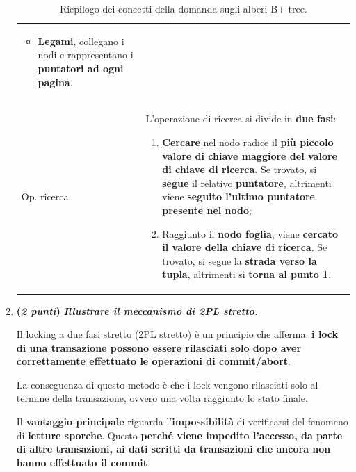 \documentclass[a4paper]{article}
\begin{document}
\begin{enumerate}
\begin{table}[!htp]
\begin{tabular}{@{} l p{23em} @{}}
\begin{itemize}
					\item \textbf{Legami}, collegano i nodi e rappresentano i \textbf{puntatori ad ogni pagina}.
				\end{itemize} \\ 
				Op. ricerca	& L'operazione di ricerca si divide in \textbf{due fasi}:
				\begin{enumerate}
					\item \textbf{Cercare} nel nodo radice il \textbf{più piccolo valore di chiave maggiore del valore di chiave di ricerca}. Se trovato, si \textbf{segue} il relativo \textbf{puntatore}, altrimenti viene \textbf{seguito l'ultimo puntatore presente nel nodo};
					
					\item Raggiunto il \textbf{nodo foglia}, viene \textbf{cercato il valore della chiave di ricerca}. Se trovato, si segue la \textbf{strada verso la tupla}, altrimenti si \textbf{torna al punto 1}.
				\end{enumerate} \\
				\bottomrule
			\end{tabular}
			\caption{Riepilogo dei concetti della domanda sugli alberi B+-tree.}
		\end{table}\newpage
		
		\item \textbf{(\emph{2 punti})} \textcolor{Green4}{\textbf{\emph{Illustrare il meccanismo di 2PL stretto.}}}\label{dom: 2PL stretto}
		
		Il locking a due fasi stretto (2PL stretto) è un principio che afferma: \textbf{i lock di una transazione possono essere rilasciati solo dopo aver correttamente effettuato le operazioni di commit/abort}.
		
		La conseguenza di questo metodo è che i lock vengono rilasciati solo al termine della transazione, ovvero una volta raggiunto lo stato finale.
		
		Il \textbf{vantaggio principale} riguarda l'\textbf{impossibilità} di verificarsi del fenomeno di \textbf{letture sporche}. Questo \textbf{perché viene impedito l'accesso, da parte di altre transazioni, ai dati scritti da transazioni che ancora non hanno effettuato il \textsf{commit}}.
		

\end{enumerate}
\end{document}
